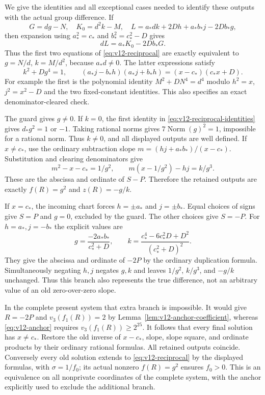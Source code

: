 We give the identities and all exceptional cases needed to identify
these outputs with the actual group difference.  If
\[
 G=dg-N,\quad K_0=d^2k-M,\quad
 L=a_*dk+2Dh+a_*b_*j-2Db_*g,
\]
then expansion using $a_*^2=c_*$ and $b_*^2=c_*^2-D$ gives
\begin{equation}\label{eq:v12-dcancel}
 dL=a_*K_0-2Db_*G.
\end{equation}
Thus the first two equations of \eqref{eq:v12-reciprocal} are
exactly equivalent to $g=N/d$, $k=M/d^2$, because $a_*d\ne0$.
The latter expressions satisfy
\begin{equation}\label{eq:v12-reciprocal-identities}
 k^2+Dg^4=1,\qquad
 (a_*j-b_*h)(a_*j+b_*h)=(x-c_*)(c_*x+D).
\end{equation}
For example the first is the polynomial identity
$M^2+DN^4=d^4$ modulo $h^2=x$, $j^2=x^2-D$ and the two fixed-constant
identities.  This also specifies an exact denominator-cleared check.

The guard gives $g\ne0$.  If $k=0$, the first identity in
\eqref{eq:v12-reciprocal-identities} gives $d_*g^2=1$ or $-1$.
Taking rational norms gives $7\operatorname{Norm}(g)^2=1$, impossible
for a rational norm.  Thus $k\ne0$, and all displayed outputs are
well defined.  If $x\ne c_*$, use the ordinary subtraction slope
$m=(hj+a_*b_*)/(x-c_*)$.  Substitution and clearing denominators give
\[
 m^2-x-c_*=1/g^2,\qquad
 m(x-1/g^2)-hj=k/g^3.
\]
These are the abscissa and ordinate of $S-P$.  Therefore the retained
outputs are exactly $f(R)=g^2$ and $z(R)=-g/k$.

If $x=c_*$, the incoming chart forces
$h=\pm a_*$ and $j=\pm b_*$.  Equal choices of signs give $S=P$
and $g=0$, excluded by the guard.  The other choices give $S=-P$.
For $h=a_*,j=-b_*$ the explicit values are
\[
 g=\frac{-2a_*b_*}{c_*^2+D},\qquad
 k=\frac{c_*^4-6c_*^2D+D^2}{(c_*^2+D)^2}.
\]
They give the abscissa and ordinate of $-2P$ by the ordinary duplication
formula.  Simultaneously negating $h,j$ negates $g,k$ and leaves
$1/g^2$, $k/g^3$, and $-g/k$ unchanged.  Thus this branch also represents
the true difference, not an arbitrary value of an old zero-over-zero
slope.

In the complete present system that extra branch is impossible.
It would give $R=-2P$ and $v_3(f_1(R))=2$ by
Lemma~\ref{lem:v12-anchor-coefficient}, whereas
\eqref{eq:v12-anchor} requires $v_3(f_1(R))\ge2^{25}$.
It follows that every final solution has $x\ne c_*$.  Restore the old
inverse of $x-c_*$, slope, slope square, and ordinate products by their
ordinary rational formulas.  All retained outputs coincide.  Conversely
every old solution extends to \eqref{eq:v12-reciprocal} by the displayed
formulas, with $\sigma=1/f_0$; its actual nonzero $f(R)=g^2$ ensures
$f_0>0$.  This is an equivalence on all nonprivate coordinates of the
complete system, with the anchor explicitly used to exclude the
additional branch.

